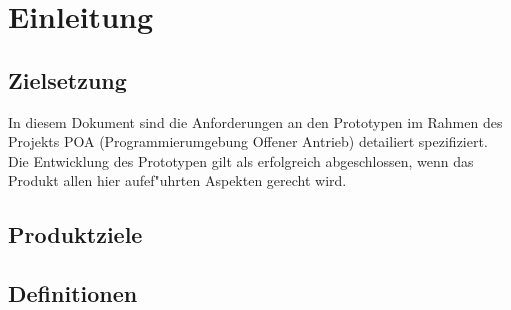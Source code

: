 
\chapter {Einleitung}
\section {Zielsetzung}
In diesem Dokument sind die Anforderungen an den Prototypen im Rahmen des Projekts POA (Programmierumgebung Offener Antrieb) 
detailiert spezifiziert. Die Entwicklung des Prototypen gilt als erfolgreich abgeschlossen, wenn das Produkt allen hier aufef"uhrten Aspekten
gerecht wird.
\section {Produktziele}
\section {Definitionen}
\
